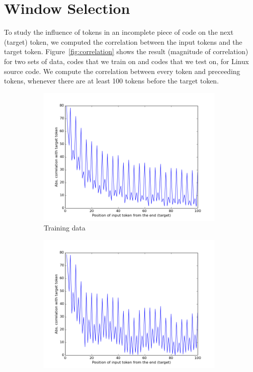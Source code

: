 \section{Window Selection}
\label{sec:window}

\noindent
To study the influence of tokens in an incomplete piece of code on the next
(target) token, we computed the correlation between the input tokens and the
target token.
Figure~\ref{fig:correlation} shows the result (magnitude of correlation) for
two sets of data, codes that we train on and codes that we test on, for Linux
source code.
We compute the correlation between every token and preceeding tokens, whenever
there are at least 100 tokens before the target token.

\begin{figure}[h]
  \centering
  \begin{subfigure}{0.4\textwidth}
    \centering
    \includegraphics[width=\linewidth]{figs/correlation_train.png}
    \caption{Training data}
    \label{fig:correlation-train}
  \end{subfigure}
  \begin{subfigure}{0.4\textwidth}
    \centering
    \includegraphics[width=\linewidth]{figs/correlation_test.png}

\end{subfigure}
\end{figure}
